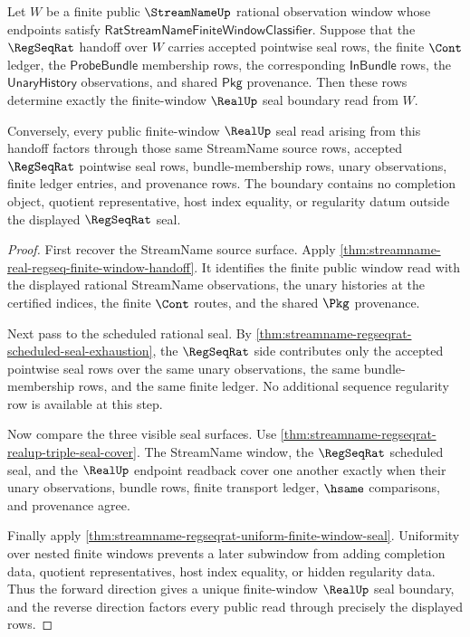 \begin{theorem}
\label{thm:streamname-realup-seal-boundary}
Let $W$ be a finite public $\StreamNameUp$ rational observation window whose
endpoints satisfy $\mathsf{RatStreamNameFiniteWindowClassifier}$. Suppose that
the $\RegSeqRat$ handoff over $W$ carries accepted pointwise seal rows, the
finite $\Cont$ ledger, the $\mathsf{ProbeBundle}$ membership rows, the
corresponding $\mathsf{InBundle}$ rows, the $\mathsf{UnaryHistory}$
observations, and shared $\mathsf{Pkg}$ provenance. Then these rows determine
exactly the finite-window $\RealUp$ seal boundary read from $W$.

Conversely, every public finite-window $\RealUp$ seal read arising from this
handoff factors through those same StreamName source rows, accepted
$\RegSeqRat$ pointwise seal rows, bundle-membership rows, unary observations,
finite ledger entries, and provenance rows. The boundary contains no completion
object, quotient representative, host index equality, or regularity datum
outside the displayed $\RegSeqRat$ seal.
\end{theorem}
\begin{proof}
First recover the StreamName source surface. Apply
\autoref{thm:streamname-real-regseq-finite-window-handoff}. It identifies the
finite public window read with the displayed rational StreamName observations,
the unary histories at the certified indices, the finite $\Cont$ routes, and
the shared $\Pkg$ provenance.

Next pass to the scheduled rational seal. By
\autoref{thm:streamname-regseqrat-scheduled-seal-exhaustion}, the
$\RegSeqRat$ side contributes only the accepted pointwise seal rows over the
same unary observations, the same bundle-membership rows, and the same finite
ledger. No additional sequence regularity row is available at this step.

Now compare the three visible seal surfaces. Use
\autoref{thm:streamname-regseqrat-realup-triple-seal-cover}. The StreamName
window, the $\RegSeqRat$ scheduled seal, and the $\RealUp$ endpoint readback
cover one another exactly when their unary observations, bundle rows, finite
transport ledger, $\hsame$ comparisons, and provenance agree.

Finally apply
\autoref{thm:streamname-regseqrat-uniform-finite-window-seal}. Uniformity over
nested finite windows prevents a later subwindow from adding completion data,
quotient representatives, host index equality, or hidden regularity data.
Thus the forward direction gives a unique finite-window $\RealUp$ seal
boundary, and the reverse direction factors every public read through precisely
the displayed rows.
\end{proof}


